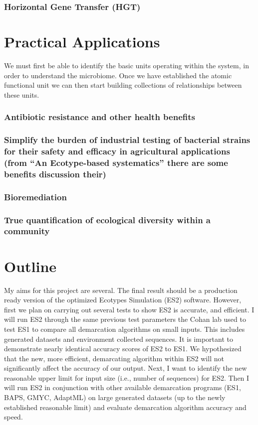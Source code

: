 \subsubsection*{Horizontal Gene Transfer (HGT)}

\section{Practical Applications}
We must first be able to identify the basic units operating within the system, in order to understand the microbiome.
Once we have established the atomic functional unit we can then start building collections of relationships between these units. 

\subsubsection*{Antibiotic resistance and other health benefits}
\subsubsection*{Simplify the burden of industrial testing of bacterial strains for their safety and efficacy in agricultural applications (from ``An Ecotype-based systematics'' there are some benefits discussion their)}
\subsubsection*{Bioremediation}
\subsubsection*{True quantification of ecological diversity within a community}


\section{Outline}%

My aims for this project are several.
The final result should be a production ready version of the optimized Ecotypes Simulation (ES2) software.
However, first we plan on carrying out several tests to show ES2 is accurate, and efficient.
I will run ES2 through the same previous test parameters the Cohan lab used to test ES1 to compare all demarcation algorithms on small inputs.
This includes generated datasets and environment collected sequences.
It is important to demonstrate nearly identical accuracy scores of ES2 to ES1.
We hypothesized that the new, more efficient, demarcating algorithm within ES2 will not significantly affect the accuracy of our output.
Next, I want to identify the new reasonable upper limit for input size (i.e., number of sequences) for ES2.
Then I will run ES2 in conjunction with other available demarcation programs (ES1, BAPS, GMYC, AdaptML) on large generated datasets (up to the newly established reasonable limit) and evaluate demarcation algorithm accuracy and speed.

